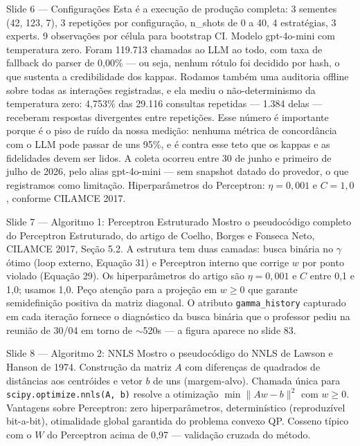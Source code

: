 \documentclass[aspectratio=169,10pt]{beamer}
\begin{document}
\begin{frame}{Slide 6 --- Configura\c{c}\~oes}
\footnotesize
Esta \'e a execu\c{c}\~ao de produ\c{c}\~ao completa: 3 sementes (42, 123, 7), 3 repeti\c{c}\~oes por configura\c{c}\~ao, n\_shots de 0 a 40, 4 estrat\'egias, 3 experts. 9 observa\c{c}\~oes por c\'elula para bootstrap CI. Modelo gpt-4o-mini com temperatura zero. Foram 119.713 chamadas ao LLM ao todo, com taxa de fallback do parser de 0,00\% --- ou seja, nenhum r\'otulo foi decidido por hash, o que sustenta a credibilidade dos kappas. Rodamos tamb\'em uma auditoria offline sobre todas as intera\c{c}\~oes registradas, e ela mediu o n\~ao-determinismo da temperatura zero: 4,753\% das 29.116 consultas repetidas --- 1.384 delas --- receberam respostas divergentes entre repeti\c{c}\~oes. Esse n\'umero \'e importante porque \'e o piso de ru\'ido da nossa medi\c{c}\~ao: nenhuma m\'etrica de concord\^ancia com o LLM pode passar de uns 95\%, e \'e contra esse teto que os kappas e as fidelidades devem ser lidos. A coleta ocorreu entre 30 de junho e primeiro de julho de 2026, pelo alias gpt-4o-mini --- sem snapshot datado do provedor, o que registramos como limita\c{c}\~ao. Hiperpar\^ametros do Perceptron: $\eta=0{,}001$ e $C=1{,}0$, conforme CILAMCE 2017.
\end{frame}

\begin{frame}{Slide 7 --- Algoritmo 1: Perceptron Estruturado}
\footnotesize
Mostro o pseudoc\'odigo completo do Perceptron Estruturado, do artigo de Coelho, Borges e Fonseca Neto, CILAMCE 2017, Se\c{c}\~ao 5.2. A estrutura tem duas camadas: busca bin\'aria no $\gamma$ \'otimo (loop externo, Equa\c{c}\~ao 31) e Perceptron interno que corrige $w$ por ponto violado (Equa\c{c}\~ao 29). Os hiperpar\^ametros do artigo s\~ao $\eta=0{,}001$ e $C$ entre 0{,}1 e 1{,}0; usamos 1{,}0. Pe\c{c}o aten\c{c}\~ao para a proje\c{c}\~ao em $w \geq 0$ que garante semidefini\c{c}\~ao positiva da matriz diagonal. O atributo \texttt{gamma\_history} capturado em cada itera\c{c}\~ao fornece o diagn\'ostico da busca bin\'aria que o professor pediu na reuni\~ao de 30/04 em torno de $\sim$520s --- a figura aparece no slide 83.
\end{frame}

\begin{frame}{Slide 8 --- Algoritmo 2: NNLS}
\footnotesize
Mostro o pseudoc\'odigo do NNLS de Lawson e Hanson de 1974. Constru\c{c}\~ao da matriz $A$ com diferen\c{c}as de quadrados de dist\^ancias aos centr\'oides e vetor $b$ de uns (margem-alvo). Chamada \'unica para \texttt{scipy.optimize.nnls(A, b)} resolve a otimiza\c{c}\~ao $\min \|Aw-b\|^2$ com $w \geq 0$. Vantagens sobre Perceptron: zero hiperpar\^ametros, determin\'istico (reproduz\'ivel bit-a-bit), otimalidade global garantida do problema convexo QP. Cosseno t\'ipico com o $W$ do Perceptron acima de 0{,}97 --- valida\c{c}\~ao cruzada do m\'etodo.
\end{frame}
\end{document}
